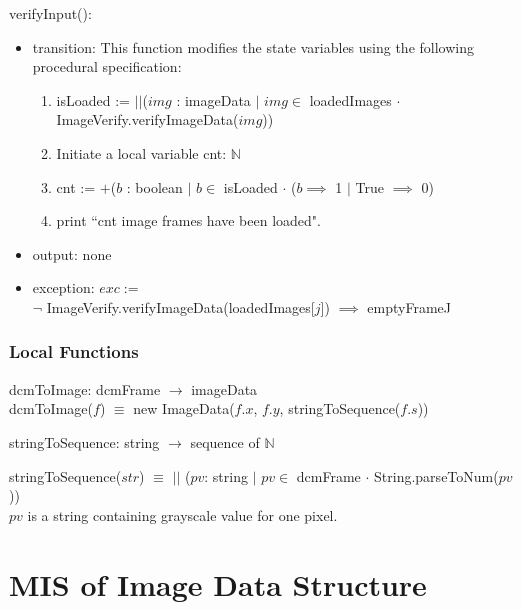 \documentclass[12pt, titlepage]{article}
\begin{document}
\noindent verifyInput():
\begin{itemize}
\item transition: 
This function modifies the state variables using the following procedural
specification:
\begin{enumerate}
\item
isLoaded := $||$($img$ : imageData $|$ $img \in$ loadedImages $\cdot$
ImageVerify.verifyImageData($img$))
\item Initiate a local variable cnt: $\mathbb{N}$
\item cnt := $+$($b$ : boolean $|$ $b \in$ isLoaded $\cdot$
($b \implies$ 1 $|$ True $\implies$ 0)
\item print ``cnt image frames have been loaded".
\end{enumerate}
\item output: none 
\item exception: $exc :=$\\
$\neg$ ImageVerify.verifyImageData(loadedImages[$j$]) $\implies$ emptyFrameJ
\end{itemize}


\subsubsection{Local Functions}

\noindent dcmToImage: dcmFrame $\rightarrow$ imageData\\
\noindent dcmToImage($f$) $\equiv$ new ImageData($f.x$, $f.y$,
stringToSequence($f.s$))

\noindent stringToSequence: string $\rightarrow$ sequence of $\mathbb{N}$

\noindent stringToSequence($str$) $\equiv$
$||$ ($pv$: string $|$ $pv \in$ dcmFrame $\cdot$ String.parseToNum($pv$))\\
$pv$ is a string containing grayscale value for one pixel.

\newpage

\section{MIS of Image Data Structure} \label{Md_ImageDS}
\end{document}
